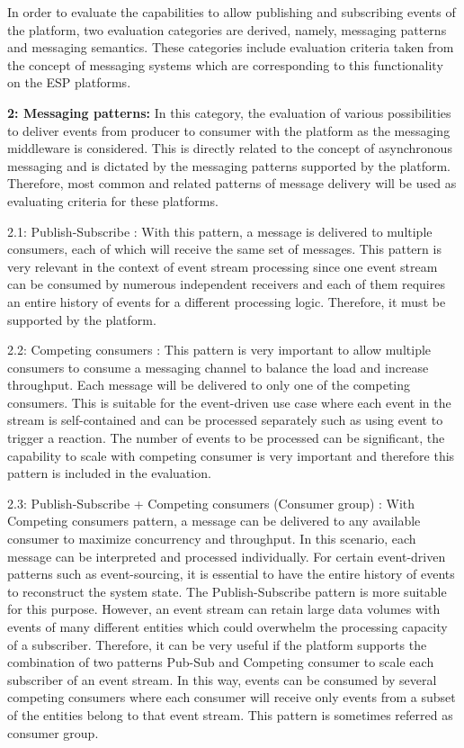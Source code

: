 In order to evaluate the capabilities to allow publishing and subscribing events of the platform, two evaluation categories are derived, namely, messaging patterns and messaging semantics. These categories include evaluation criteria taken from the concept of messaging systems which are corresponding to this functionality on the ESP platforms.

\textbf{2: Messaging patterns:} In this category, the evaluation of various possibilities to deliver events from producer to consumer with the platform as the messaging middleware is considered. This is directly related to the concept of asynchronous messaging and is dictated by the messaging patterns supported by the platform. Therefore, most common and related patterns of message delivery will be used as evaluating criteria for these platforms.

2.1: Publish-Subscribe \cite{messagingpubsub}: 
With this pattern, a message is delivered to multiple consumers, each of which will receive the same set of messages. This pattern is very relevant in the context of event stream processing since one event stream can be consumed by numerous independent receivers and each of them requires an entire history of events for a different processing logic. Therefore, it must be supported by the platform.

2.2: Competing consumers \cite{messagingcompetingconsumer}:
This pattern is very important to allow multiple consumers to consume a messaging channel to balance the load and increase throughput. Each message will be delivered to only one of the competing consumers. This is suitable for the event-driven use case where each event in the stream is self-contained and can be processed separately such as using event to trigger a reaction. The number of events to be processed can be significant, the capability to scale with competing consumer is very important and therefore this pattern is included in the evaluation.

2.3: Publish-Subscribe + Competing consumers (Consumer group) \cite{messagingcompetingconsumer}:
With Competing consumers pattern, a message can be delivered to any available consumer to maximize concurrency and throughput. In this scenario, each message can be interpreted and processed individually. For certain event-driven patterns such as event-sourcing, it is essential to have the entire history of events to reconstruct the system state. The Publish-Subscribe pattern is more suitable for this purpose. However, an event stream can retain large data volumes with events of many different entities which could overwhelm the processing capacity of a subscriber. Therefore, it can be very useful if the platform supports the combination of two patterns Pub-Sub and Competing consumer to scale each subscriber of an event stream. In this way, events can be consumed by several competing consumers where each consumer will receive only events from a subset of the entities belong to that event stream. This pattern is sometimes referred as consumer group.

